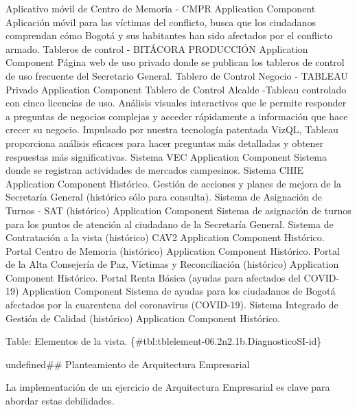 \documentclass[
	a4paper, %
	12pt, %
]{include/CSSullivanBusinessReport}
\begin{document}
\textbar{} \textbar{} Aplicativo móvil de Centro de Memoria - CMPR
\textbar{} Application Component \textbar{} Aplicación móvil para las
víctimas del conflicto, busca que los ciudadanos comprendan cómo Bogotá
y sus habitantes han sido afectados por el conflicto armado. \textbar{}
\textbar{} Tableros de control - BITÁCORA PRODUCCIÓN \textbar{}
Application Component \textbar{} Página web de uso privado donde se
publican los tableros de control de uso frecuente del Secretario
General. \textbar{} \textbar{} Tablero de Control Negocio - TABLEAU
Privado \textbar{} Application Component \textbar{} Tablero de Control
Alcalde -Tableau controlado con cinco licencias de uso. Análisis
visuales interactivos que le permite responder a preguntas de negocios
complejas y acceder rápidamente a información que hace crecer su
negocio. Impulsado por nuestra tecnología patentada VizQL, Tableau
proporciona análisis eficaces para hacer preguntas más detalladas y
obtener respuestas más significativas. \textbar{} \textbar{} Sistema VEC
\textbar{} Application Component \textbar{} Sistema donde se registran
actividades de mercados campesinos. \textbar{} \textbar{} Sistema CHIE
\textbar{} Application Component \textbar{} Histórico. Gestión de
acciones y planes de mejora de la Secretaría General (histórico sólo
para consulta). \textbar{} \textbar{} Sistema de Asignación de Turnos -
SAT (histórico) \textbar{} Application Component \textbar{} Sistema de
asignación de turnos para los puntos de atención al ciudadano de la
Secretaría General. \textbar{} \textbar{} Sistema de Contratación a la
vista (histórico) CAV2 \textbar{} Application Component \textbar{}
Histórico. \textbar{} \textbar{} Portal Centro de Memoria (histórico)
\textbar{} Application Component \textbar{} Histórico. \textbar{}
\textbar{} Portal de la Alta Consejería de Paz, Víctimas y
Reconciliación (histórico) \textbar{} Application Component \textbar{}
Histórico. \textbar{} \textbar{} Portal Renta Básica (ayudas para
afectados del COVID-19) \textbar{} Application Component \textbar{}
Sistema de ayudas para los ciudadanos de Bogotá afectados por la
cuarentena del coronavirus (COVID-19). \textbar{} \textbar{} Sistema
Integrado de Gestión de Calidad (histórico) \textbar{} Application
Component \textbar{} Histórico. \textbar{}

Table: Elementos de la vista.
\{\#tbl:tblelement-06.2n2.1b.DiagnosticoSI-id\}

undefined\#\# Planteamiento de Arquitectura Empresarial

La implementación de un ejercicio de Arquitectura Empresarial es clave
para abordar estas debilidades.
\end{document}
